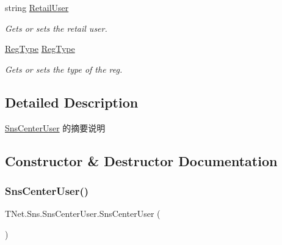 \begin{DoxyCompactItemize}
string \mbox{\hyperlink{class_t_net_1_1_sns_1_1_sns_center_user_a7ee732c4983084e2f9a9c1553f89e455}{Retail\+User}}
\begin{DoxyCompactList}\small\item\em Gets or sets the retail user. \end{DoxyCompactList}\item 
\mbox{\hyperlink{namespace_t_net_1_1_sns_a338402ea3c5dbc36f95f0a7e4c1cd3a2}{Reg\+Type}} \mbox{\hyperlink{class_t_net_1_1_sns_1_1_sns_center_user_a4cb16ce1802c310d74f6b60e26df6290}{Reg\+Type}}
\begin{DoxyCompactList}\small\item\em Gets or sets the type of the reg. \end{DoxyCompactList}\end{DoxyCompactItemize}


\subsection{Detailed Description}
\mbox{\hyperlink{class_t_net_1_1_sns_1_1_sns_center_user}{Sns\+Center\+User}} 的摘要说明 



\subsection{Constructor \& Destructor Documentation}
\mbox{\label{class_t_net_1_1_sns_1_1_sns_center_user_aae47844f2311e542bfd6a8b20452c2b0}} 
\subsubsection{\texorpdfstring{Sns\+Center\+User()}{SnsCenterUser()}\hspace{0.1cm}{\footnotesize\ttfamily [1/2]}}
{\footnotesize\ttfamily T\+Net.\+Sns.\+Sns\+Center\+User.\+Sns\+Center\+User (\begin{DoxyParamCaption}{ }\end{DoxyParamCaption})}



